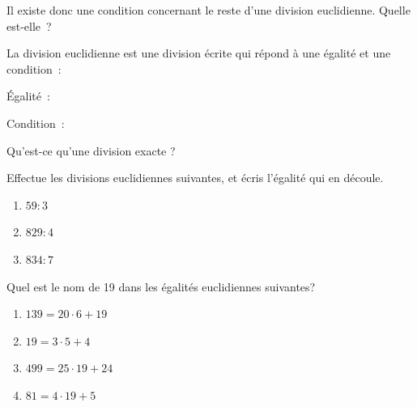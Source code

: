 \documentclass[../../syllabus_2.tex]{subfiles}
\begin{document}
Il existe donc une condition concernant le reste d'une division euclidienne. Quelle est-elle~?


\newpage
La division euclidienne est une division écrite qui répond à une égalité
et une condition~:
\vspace{7cm}


Égalité~:

Condition~:

Qu'est-ce qu'une division exacte ?

\begin{exercise}
    Effectue les divisions euclidiennes suivantes, et écris l'égalité qui en découle.
    \begin{enumerate}[cols=3]
        \item $59 : 3$
        \item $829 : 4$
        \item $834 : 7$
    \end{enumerate}
\end{exercise}

\newpage

\begin{exercise}
    Quel est le nom de 19 dans les égalités euclidiennes suivantes?\\
    \begin{enumerate}[itemsep=1em]
        \item $139=20\cdot 6+19$\hfill\dotfillbox[8cm]
        \item $19=3\cdot 5+4$\hfill\dotfillbox[8cm]
        \item $499=25\cdot 19+24$\hfill\dotfillbox[8cm]
        \item $81=4\cdot 19+5$\hfill\dotfillbox[8cm]
    \end{enumerate}
\end{exercise}
\end{document}
